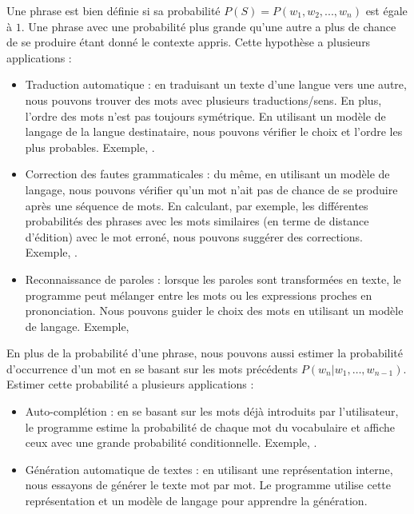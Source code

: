 \documentclass{KodeBook}
\begin{document}
Une phrase est bien définie si sa probabilité $P(S) = P(w_1, w_2, ..., w_n) $ est égale à $1$. 
Une phrase avec une probabilité plus grande qu'une autre a plus de chance de se produire étant donné le contexte appris. 
Cette hypothèse a plusieurs applications : 
\begin{itemize}
	\item Traduction automatique : en traduisant un texte d'une langue vers une autre, nous pouvons trouver des mots avec plusieurs traductions/sens. 
	En plus, l'ordre des mots n'est pas toujours symétrique. 
	En utilisant un modèle de langage de la langue destinataire, nous pouvons vérifier le choix et l'ordre les plus probables. 
	Exemple, 
	.
	
	\item Correction des fautes grammaticales : du même, en utilisant un modèle de langage, nous pouvons vérifier qu'un mot n'ait pas de chance de se produire après une séquence de mots. 
	En calculant, par exemple, les différentes probabilités des phrases avec les mots similaires (en terme de distance d'édition) avec le mot erroné, nous pouvons suggérer des corrections.
	Exemple, .
	
	\item Reconnaissance de paroles : lorsque les paroles sont transformées en texte, le programme peut mélanger entre les mots ou les expressions proches en prononciation. 
	Nous pouvons guider le choix des mots en utilisant un modèle de langage.
	Exemple, 
\end{itemize}
%
En plus de la probabilité d'une phrase, nous pouvons aussi estimer la probabilité d'occurrence d'un mot en se basant sur les mots précédents $P(w_n | w_1, \ldots, w_{n-1}) $. 
Estimer cette probabilité a plusieurs applications :
\begin{itemize}
	\item Auto-complétion : en se basant sur les mots déjà introduits par l'utilisateur, le programme estime la probabilité de chaque mot du vocabulaire et affiche ceux avec une grande probabilité conditionnelle.
	Exemple, .
	
	\item Génération automatique de textes : en utilisant une représentation interne, nous essayons de générer le texte mot par mot. 
	Le programme utilise cette représentation et un modèle de langage pour apprendre la génération.
\end{itemize}
\end{document}
